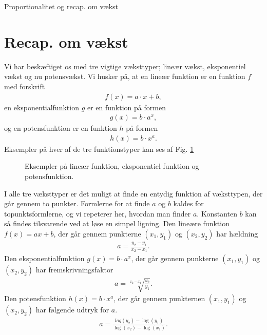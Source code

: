 
\begin{center}
\Huge
Proportionalitet og recap. om vækst
\end{center}
\section*{Recap. om vækst}

Vi har beskæftiget os med tre vigtige væksttyper; lineær vækst, eksponentiel vækst og nu potensvækst. Vi husker på, at en lineær funktion er en funktion $f$ med forskrift
\begin{align*}
f(x) = a\cdot x +b,
\end{align*}
en eksponentialfunktion $g$ er en funktion på formen
\begin{align*}
g(x) = b\cdot a^x,
\end{align*}
og en potensfunktion er en funktion $h$ på formen 
\begin{align*}
h(x) = b\cdot x^a.
\end{align*}
Eksempler på hver af de tre funktionstyper kan ses af Fig. \ref{fig:linekspot}
\begin{figure}[H]
\caption{Eksempler på lineær funktion, eksponentiel funktion og potensfunktion.}
\label{fig:linekspot}
\end{figure}
I alle tre væksttyper er det muligt at finde en entydig funktion af væksttypen, der går gennem to punkter. Formlerne for at finde $a$ og $b$ kaldes for topunktsformlerne, og vi repeterer her, hvordan man finder $a$. Konstanten $b$ kan så findes tilsvarende ved at løse en simpel ligning. 
Den lineære funktion $f(x)=ax+b$, der går gennem punkterne $(x_1,y_1)$ og $(x_2,y_2)$ har hældning 
\begin{align*}
a = \frac{y_2-y_1}{x_2-x_1}.
\end{align*}
Den eksponentialfunktion $g(x) = b\cdot a^x$, der går gennem punkterne $(x_1,y_1)$ og $(x_2,y_2)$ har fremskrivningsfaktor 
\begin{align*}
a = \sqrt[x_2-x_1]{\frac{y_2}{y_1}}.
\end{align*}
Den potensfunktion $h(x) = b\cdot x^a$, der går gennem punkternen $(x_1,y_1)$ og $(x_2,y_2)$ har følgende udtryk for $a$.
\begin{align*}
a = \frac{log(y_2)-\log(y_1)}{\log(x_2)-\log(x_1)}.
\end{align*}
